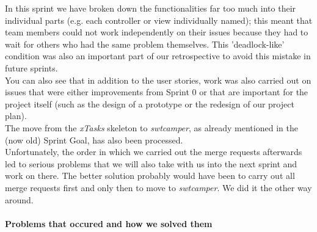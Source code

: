 In this sprint we have broken down the functionalities far too much into their individual parts (e.g. each controller or view individually named); this meant that team members could not work independently on their issues because they had to wait for others who had the same problem themselves. This 'deadlock-like' condition was also an important part of our retrospective to avoid this mistake in future sprints. \\
You can also see that in addition to the user stories, work was also carried out on issues that were either improvements from Sprint 0 or that are important for the project itself (such as the design of a prototype or the redesign of our project plan). \\
The move from the \textit{xTasks} skeleton to \textit{swtcamper}, as already mentioned in the (now old) Sprint Goal, has also been processed. \\
Unfortunately, the order in which we carried out the merge requests afterwards led to serious problems that we will also take with us into the next sprint and work on there. The better solution probably would have been to carry out all merge requests first and only then to move to \textit{swtcamper}. We did it the other way around.

\paragraph{Problems that occured and how we solved them}

